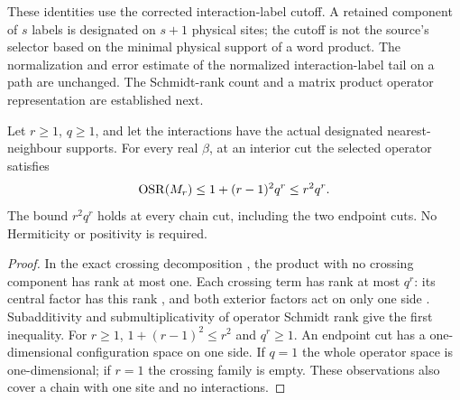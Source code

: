 These identities use the corrected interaction-label cutoff. A retained
component of $s$ labels is designated on $s+1$ physical sites; the cutoff
is not the source's selector based on the minimal physical support of a
word product. The normalization and error estimate of
the normalized interaction-label tail on a path
\cite[``Normalized interaction-label tail on a path'']{QICLean2026Blueprint} are unchanged. The
Schmidt-rank count and a matrix product operator representation are
established next.

\begin{lemma}
    \label{thm:physical_cluster_all_cut_rank}
    \leanok
    Let $r\geq1$, $q\geq1$, and let the interactions have the actual
    designated nearest-neighbour supports. For every real $\beta$,
    at an interior cut the selected operator satisfies
    \begin{align}
        \operatorname{OSR}(M_r)
        \leq1+(r-1)^2q^r\leq r^2q^r.\notag
    \end{align}
    The bound $r^2q^r$ holds at every chain cut, including the two
    endpoint cuts. No Hermiticity or positivity is required.
\end{lemma}
\begin{proof}\leanok
    In the exact crossing decomposition
    \cite[``Physical nearest-neighbour crossing decomposition'' and ``Counting crossing label
        intervals'']{QICLean2026Blueprint}, the product with no
    crossing component has rank at most one. Each crossing term
    has rank at most $q^r$: its central factor has this rank
    \cite[``Two-sided rank of a crossing interval'']{QICLean2026Blueprint},
    and both exterior factors act on only one side
    \cite[``Physical support of retained side sums'']{QICLean2026Blueprint}.
    Subadditivity and
    submultiplicativity of operator Schmidt rank give the first
    inequality. For $r\geq1$, $1+(r-1)^2\leq r^2$ and $q^r\geq1$.
    An endpoint cut has a one-dimensional configuration space on
    one side. If $q=1$ the whole operator space is one-dimensional;
    if $r=1$ the crossing family is empty. These observations also
    cover a chain with one site and no interactions.
\end{proof}


